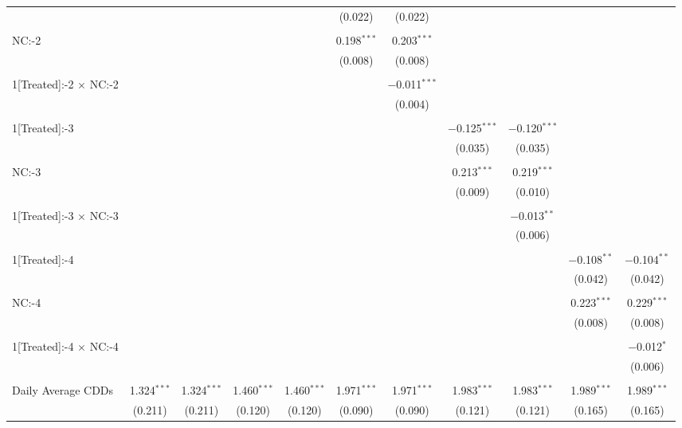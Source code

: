 \begin{table}[!htbp]
\begin{tabular}{@{\extracolsep{5pt}}lcccccccccc}
  &  &  &  &  & (0.022) & (0.022) &  &  &  &  \\ 
  & & & & & & & & & & \\ 
 NC:-2 &  &  &  &  & 0.198$^{***}$ & 0.203$^{***}$ &  &  &  &  \\ 
  &  &  &  &  & (0.008) & (0.008) &  &  &  &  \\ 
  & & & & & & & & & & \\ 
 1[Treated]:-2 $\times$ NC:-2 &  &  &  &  &  & $-$0.011$^{***}$ &  &  &  &  \\ 
  &  &  &  &  &  & (0.004) &  &  &  &  \\ 
  & & & & & & & & & & \\ 
 1[Treated]:-3 &  &  &  &  &  &  & $-$0.125$^{***}$ & $-$0.120$^{***}$ &  &  \\ 
  &  &  &  &  &  &  & (0.035) & (0.035) &  &  \\ 
  & & & & & & & & & & \\ 
 NC:-3 &  &  &  &  &  &  & 0.213$^{***}$ & 0.219$^{***}$ &  &  \\ 
  &  &  &  &  &  &  & (0.009) & (0.010) &  &  \\ 
  & & & & & & & & & & \\ 
 1[Treated]:-3 $\times$ NC:-3 &  &  &  &  &  &  &  & $-$0.013$^{**}$ &  &  \\ 
  &  &  &  &  &  &  &  & (0.006) &  &  \\ 
  & & & & & & & & & & \\ 
 1[Treated]:-4 &  &  &  &  &  &  &  &  & $-$0.108$^{**}$ & $-$0.104$^{**}$ \\ 
  &  &  &  &  &  &  &  &  & (0.042) & (0.042) \\ 
  & & & & & & & & & & \\ 
 NC:-4 &  &  &  &  &  &  &  &  & 0.223$^{***}$ & 0.229$^{***}$ \\ 
  &  &  &  &  &  &  &  &  & (0.008) & (0.008) \\ 
  & & & & & & & & & & \\ 
 1[Treated]:-4 $\times$ NC:-4 &  &  &  &  &  &  &  &  &  & $-$0.012$^{*}$ \\ 
  &  &  &  &  &  &  &  &  &  & (0.006) \\ 
  & & & & & & & & & & \\ 
 Daily Average CDDs & 1.324$^{***}$ & 1.324$^{***}$ & 1.460$^{***}$ & 1.460$^{***}$ & 1.971$^{***}$ & 1.971$^{***}$ & 1.983$^{***}$ & 1.983$^{***}$ & 1.989$^{***}$ & 1.989$^{***}$ \\ 
  & (0.211) & (0.211) & (0.120) & (0.120) & (0.090) & (0.090) & (0.121) & (0.121) & (0.165) & (0.165) \\ 

\end{tabular}
\end{table}
